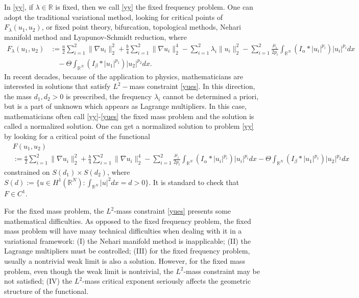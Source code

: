\documentclass[10pt,a4paper]{amsart}
\numberwithin{equation}{section}
\begin{document}
In \eqref{yy}, if $\lambda\in\mathbb{R}$ is fixed, then we call \eqref{yy} the fixed
frequency problem. One can adopt the traditional variational method,
looking for critical points of $F_\lambda(u_1,u_2)$, or fixed point theory,
bifurcation, topological methods, Nehari manifold method and Lyapunov-Schmidt reduction,
where
\begin{align*}
F_\lambda(u_1,u_2)
&:=\frac{a}{2}\sum_{i=1}^2\| \nabla u_i\|_2^2
 +\frac{b}{4}\sum_{i=1}^2\| \nabla u_i\|_2^4-\sum_{i=1}^2\lambda_i\| u_i\|_2^2
 -\sum_{i=1}^2\frac{\mu_i}{2p_i}\int_{\mathbb{R}^N}
 (I_\alpha\ast|u_i|^{p_i})|u_i|^{p_i}dx\\
&\quad -\Theta\int_{\mathbb{R}^N}(I_\beta\ast|u_1|^{p_1})|u_2|^{p_2}dx.
\end{align*}
In recent decades, because of the application to physics, mathematicians are
interested in solutions that satisfy $L^2-$mass constraint \eqref{yues}.
In this direction, the mass $d_1,d_2>0$ is prescribed, the frequency $\lambda_i$
cannot be determined a priori, but is a part of unknown which appears as Lagrange
multipliers.
In this case, mathematicians often call \eqref{yy}-\eqref{yues} the fixed mass
problem and the solution is called a normalized solution.
One can get a normalized solution to problem \eqref{yy} by looking for a critical
point of the  functional
\begin{align*}
&F(u_1,u_2) \\
&:=\frac{a}{2}\sum_{i=1}^2\| \nabla u_i\|_2^2
 +\frac{b}{4}\sum_{i=1}^2\| \nabla u_i\|_2^4-
\sum_{i=1}^2\frac{\mu_i}{2p_i}\int_{\mathbb{R}^N}(I_\alpha\ast|u_i|^{p_i})|u_i|^{p_i}dx
-\Theta\int_{\mathbb{R}^N}(I_\beta\ast|u_1|^{p_1})|u_2|^{p_2}dx
\end{align*}
constrained on $S(d_1)\times S(d_2)$, where
$S(d):=\{u\in H^1(\mathbb{R}^N): \int_{\mathbb{R}^N}|u|^2dx=d>0\}$.
It is standard to check that $F\in C^1$.

For the fixed mass problem, the $L^2$-mass constraint \eqref{yues} presents some
mathematical difficulties. As opposed to the fixed
frequency problem, the fixed mass problem will have many technical difficulties when
dealing with it in a variational framework:
(I) the Nehari manifold method is inapplicable;
(II) the Lagrange multipliers must be controlled;
(III) for the fixed frequency problem, usually a
nontrivial weak limit is also a solution.
However, for the fixed mass problem, even though the weak limit is nontrivial, the
$L^2$-mass constraint may be not satisfied;
(IV) the $L^2$-mass critical exponent seriously affects the geometric structure of the
functional.
\end{document}
